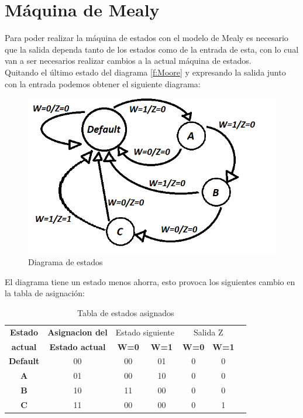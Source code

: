 \section{Máquina de Mealy}
Para poder realizar la máquina de estados con el modelo de Mealy es necesario que la salida dependa tanto de los estados como de la entrada de esta, con lo cual van a ser necesarios realizar cambios a la actual máquina de estados.\\
Quitando el último estado del diagrama \ref{f:Moore} y expresando la salida junto con la entrada podemos obtener el siguiente diagrama:\\
\FloatBarrier
\begin{figure}[h!]
	\label{f:Meale}
	\centering
	\includegraphics[scale=0.4]{../Ejercicio-2/Diagrama_de_estados_2.png}
	\caption{Diagrama de estados}
\end{figure}
\FloatBarrier
El diagrama tiene un estado menos ahorra, esto provoca los siguientes cambio en la tabla de asignación:\\
\FloatBarrier
\begin{table}[h!]
	\begin{center}
		\label{t:Tabla2}
		\caption{Tabla de estados asignados}
			\begin{tabular}{|c|c|c c|c|c|c|}
			\hline
			\textbf{Estado} & \textbf{Asignacion del} &\multicolumn{2}{|c|}{Estado siguiente} & \multicolumn{2}{|c|}{Salida Z}\\
			\textbf{actual}  & \textbf{Estado actual} & \textbf{ W=0 } & \textbf{ W=1 } & \textbf{ W=0 } & \textbf{ W=1 } \\
			\hline
			\textbf{Default} & 00 & 00 &  01 & 0 & 0\\
			\hline
			\textbf{A} & 01 & 00 &  10 & 0 & 0\\
			\hline
			\textbf{B} & 10 & 11 & 00 & 0 & 0\\
			\hline
			\textbf{C} & 11 & 00 & 00 & 0 & 1\\
			\hline
			\end{tabular}
	\end{center}
\end{table}
